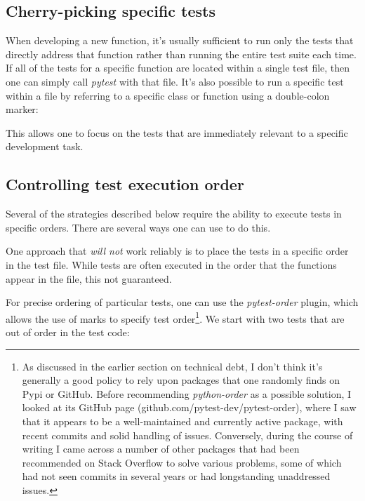 \subsection{Cherry-picking specific tests}

When developing a new function, it's usually sufficient to run only the tests that directly address that function rather than running the entire test suite each time.
If all of the tests for a specific function are located within a single test file, then one can simply call \textit{pytest} with that file.
It's also possible to run a specific test within a file by referring to a specific class or function using a double-colon marker:



This allows one to focus on the tests that are immediately relevant to a specific development task.

\subsection{Controlling test execution order}

Several of the strategies described below require the ability to execute tests in specific orders.
There are several ways one can use to do this.

One approach that \textit{will not} work reliably is to place the tests in a specific order in the test file.
While tests are often executed in the order that the functions appear in the file, this not guaranteed.

For precise ordering of particular tests, one can use the \textit{pytest-order} plugin, which allows the use of marks to specify test order\footnote{As discussed in the earlier section on technical debt, I don't think it's generally a good policy to rely upon packages that one randomly finds on Pypi or GitHub.
Before recommending \textit{python-order} as a possible solution, I looked at its GitHub page (github.com/pytest-dev/pytest-order), where I saw that it appears to be a well-maintained and currently active package, with recent commits and solid handling of issues.
Conversely, during the course of writing I came across a number of other packages that had been recommended on Stack Overflow to solve various problems, some of which had not seen commits in several years or had longstanding unaddressed issues.}.
We start with two tests that are out of order in the test code:

